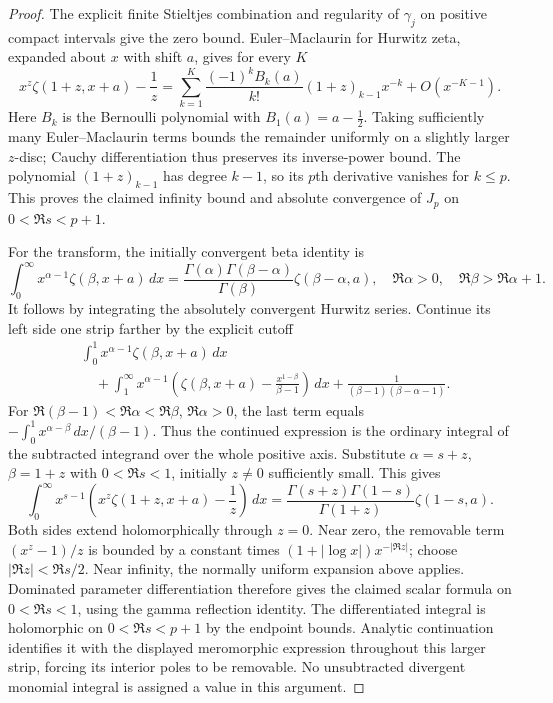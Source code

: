 \begin{proof}
The explicit finite Stieltjes combination and regularity of $\gamma_j$
on positive compact intervals give the zero bound.  Euler--Maclaurin
for Hurwitz zeta, expanded about $x$ with shift $a$, gives for every $K$
\[
 x^z\zeta(1+z,x+a)-\frac1z
 =\sum_{k=1}^{K}\frac{(-1)^kB_k(a)}{k!}(1+z)_{k-1}x^{-k}
        +O(x^{-K-1}).
\]
Here $B_k$ is the Bernoulli polynomial with $B_1(a)=a-\tfrac12$.
Taking sufficiently many Euler--Maclaurin terms bounds the remainder
uniformly on a slightly larger $z$-disc; Cauchy differentiation thus
preserves its inverse-power bound.  The polynomial $(1+z)_{k-1}$ has
degree $k-1$, so its $p$th derivative vanishes for $k\leq p$.
This proves the claimed infinity bound and absolute convergence of $J_p$
on $0<\Re s<p+1$.

For the transform, the initially convergent beta identity is
\[
 \int_0^\infty x^{\alpha-1}\zeta(\beta,x+a)\,dx
 =\frac{\Gamma(\alpha)\Gamma(\beta-\alpha)}{\Gamma(\beta)}
       \zeta(\beta-\alpha,a),
 \quad\Re\alpha>0,\quad\Re\beta>\Re\alpha+1.
\]
It follows by integrating the absolutely convergent Hurwitz series.
Continue its left side one strip farther by the explicit cutoff
\begin{align*}
 &\int_0^1x^{\alpha-1}\zeta(\beta,x+a)\,dx\\
 &\quad+\int_1^\infty x^{\alpha-1}
       \left(\zeta(\beta,x+a)-\frac{x^{1-\beta}}{\beta-1}\right)\,dx
       +\frac1{(\beta-1)(\beta-\alpha-1)}.
\end{align*}
For $\Re(\beta-1)<\Re\alpha<\Re\beta$, $\Re\alpha>0$, the last term
equals $-\int_0^1x^{\alpha-\beta}\,dx/(\beta-1)$.  Thus the continued
expression is the ordinary integral of the subtracted integrand over
the whole positive axis.  Substitute $\alpha=s+z$, $\beta=1+z$ with
$0<\Re s<1$, initially $z\ne0$ sufficiently small.  This gives
\[
 \int_0^\infty x^{s-1}
       \left(x^z\zeta(1+z,x+a)-\frac1z\right)\,dx
 =\frac{\Gamma(s+z)\Gamma(1-s)}{\Gamma(1+z)}\zeta(1-s,a).
\]
Both sides extend holomorphically through $z=0$.  Near zero, the removable
term $(x^z-1)/z$ is bounded by a constant times
$(1+|\log x|)x^{-|\Re z|}$; choose $|\Re z|<\Re s/2$.  Near infinity,
the normally uniform expansion above applies.  Dominated parameter
differentiation therefore gives the claimed scalar formula on
$0<\Re s<1$, using the gamma reflection identity.
The differentiated integral is holomorphic on $0<\Re s<p+1$ by the
endpoint bounds.  Analytic continuation identifies it with the displayed
meromorphic expression throughout this larger strip, forcing its interior
poles to be removable.  No unsubtracted divergent monomial integral is
assigned a value in this argument.
\end{proof}

